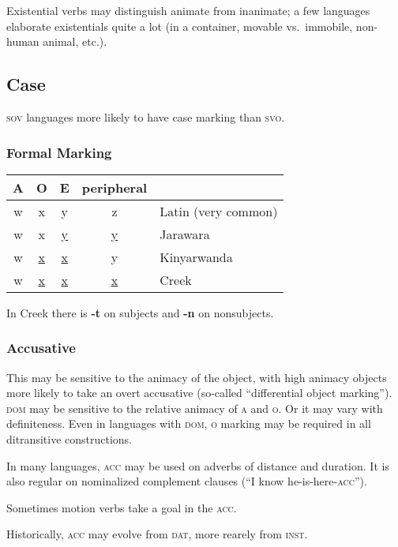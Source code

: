 \documentclass[11pt]{article}
\newcommand{\LL}[1]{\textbf{#1}}  %
\newcommand{\I}[1]{\textsc{#1}}   %
\begin{document}
Existential verbs may distinguish animate from inanimate; a few
languages elaborate existentials quite a lot (in a container, movable
vs.\ immobile, non-human animal, etc.).

\subsection{Case}
\I{sov} languages more likely to have case marking than \I{svo}.

\subsubsection{Formal Marking}
\begin{center}
  \begin{tabular}{ccccl}
    A & O & E & peripheral \\
    \hline
    w & x & y & z & Latin (very common) \\
    w & x & \uline{y} & \uline{y} & Jarawara \\
    w & \uline{x} & \uline{x} & y & Kinyarwanda \\
    w & \uline{x} & \uline{x} & \uline{x} & Creek
  \end{tabular}
\end{center}

\noindent In Creek there is \LL{-t} on subjects and \LL{-n} on
nonsubjects. 

\subsubsection{Accusative} This may be sensitive to the animacy of the
object, with high animacy objects more likely to take an overt
accusative (so-called ``differential object marking'').  \I{dom} may
be sensitive to the relative animacy of \I{a} and \I{o}.  Or it may
vary with definiteness.  Even in languages with \I{dom}, \I{o} marking
may be required in all ditransitive constructions.

In many languages, \I{acc} may be used on adverbs of distance and
duration.  It is also regular on nominalized complement clauses (``I
know he-is-here-\I{acc}'').

Sometimes motion verbs take a goal in the \I{acc}.

Historically, \I{acc} may evolve from \I{dat}, more rearely from
\I{inst}. 

\end{document}
